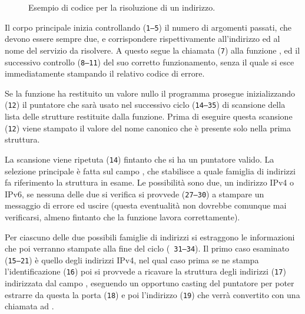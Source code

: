 \begin{figure}[!htb]
  \footnotesize \centering
  \begin{minipage}[c]{\codesamplewidth}
  \end{minipage}
  \normalsize
  \caption{Esempio di codice per la risoluzione di un indirizzo.}
  \label{fig:mygetaddr_example}
\end{figure}

Il corpo principale inizia controllando (\texttt{\small 1--5}) il numero di
argomenti passati, che devono essere sempre due, e corrispondere
rispettivamente all'indirizzo ed al nome del servizio da risolvere. A questo
segue la chiamata (\texttt{\small 7}) alla funzione , ed il
successivo controllo (\texttt{\small 8--11}) del suo corretto funzionamento,
senza il quale si esce immediatamente stampando il relativo codice di errore.

Se la funzione ha restituito un valore nullo il programma prosegue
inizializzando (\texttt{\small 12}) il puntatore  che sarà usato nel
successivo ciclo (\texttt{\small 14--35}) di scansione della lista delle
strutture  restituite dalla funzione. Prima di eseguire
questa scansione (\texttt{\small 12}) viene stampato il valore del nome
canonico che è presente solo nella prima struttura.

La scansione viene ripetuta (\texttt{\small 14}) fintanto che si ha un
puntatore valido. La selezione principale è fatta sul campo ,
che stabilisce a quale famiglia di indirizzi fa riferimento la struttura in
esame. Le possibilità sono due, un indirizzo IPv4 o IPv6, se nessuna delle due
si verifica si provvede (\texttt{\small 27--30}) a stampare un messaggio di
errore ed uscire (questa eventualità non dovrebbe comunque mai verificarsi,
almeno fintanto che la funzione  lavora correttamente).

Per ciascuno delle due possibili famiglie di indirizzi si estraggono le
informazioni che poi verranno stampate alla fine del ciclo (\texttt{\small
  31--34}). Il primo caso esaminato (\texttt{\small 15--21}) è quello degli
indirizzi IPv4, nel qual caso prima se ne stampa l'identificazione
(\texttt{\small 16}) poi si provvede a ricavare la struttura degli indirizzi
(\texttt{\small 17}) indirizzata dal campo , eseguendo un
opportuno casting del puntatore per poter estrarre da questa la porta
(\texttt{\small 18}) e poi l'indirizzo (\texttt{\small 19}) che verrà
convertito con una chiamata ad .


